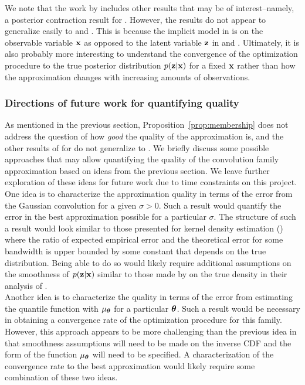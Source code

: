 \documentclass[10pt]{article}
\begin{document}
We note that the work by \citet{Plummer:2021} includes other results that may be of interest--namely, a posterior contraction result for \nllvm. However, the results do not appear to generalize easily to \sivi and \uivi. This is because the implicit model in \nllvm is on the observable variable $\mathbf{x}$ as opposed to the latent variable $\mathbf{z}$ in \sivi and \uivi. Ultimately, it is also probably more interesting to understand the convergence of the \uivi optimization procedure to the true posterior distribution $p(\mathbf{z}|\mathbf{x})$ for a fixed $\mathbf{x}$ rather than how the approximation changes with increasing amounts of observations.


\subsubsection{Directions of future work for quantifying quality} \label{sec:future:approximation}

As mentioned in the previous section, Proposition~\ref{prop:membership} does not address the question of how \textit{good} the quality of the \uivi approximation is, and the other results of \citet{Plummer:2021} for \nllvm do not generalize to \uivi. We briefly discuss some possible approaches that may allow quantifying the quality of the convolution family approximation based on ideas from the previous section. We leave further exploration of these ideas for future work due to time constraints on this project.
\\

One idea is to characterize the approximation quality in terms of the error from the Gaussian convolution for a given $\sigma>0$. Such a result would quantify the error in the best approximation possible for a particular $\sigma$. The structure of such a result would look similar to those presented for kernel density estimation (\citep[Section~9.5, Chapter~11]{Devroye:2001}) where the ratio of expected empirical error and the theoretical error for some bandwidth is upper bounded by some constant that depends on the true distribution. Being able to do so would likely require additional assumptions on the smoothness of $p(\mathbf{z}|\mathbf{x})$ similar to those made by \citet{Plummer:2021} on the true density in their analysis of \nllvm.
\\

Another idea is to characterize the quality in terms of the error from estimating the quantile function with $\mu_{\bm{\theta}}$ for a particular ${\bm{\theta}}$. Such a result would be necessary in obtaining a convergence rate of the \uivi optimization procedure for this family. However, this approach appears to be more challenging than the previous idea in that smoothness assumptions will need to be made on the inverse CDF and the form of the function $\mu_{\bm{\theta}}$ will need to be specified. \todo A characterization of the convergence rate to the best approximation would likely require some combination of these two ideas.
\end{document}
